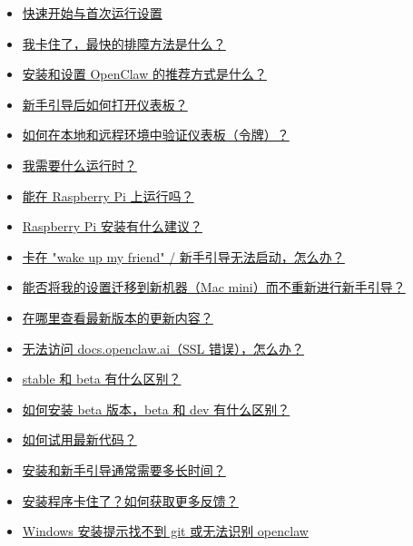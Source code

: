 \begin{itemize}
  \item \href{\#quick-start-and-firstrun-setup}{快速开始与首次运行设置}
  \item \href{\#im-stuck-whats-the-fastest-way-to-get-unstuck}{我卡住了，最快的排障方法是什么？}
  \item \href{\#whats-the-recommended-way-to-install-and-set-up-openclaw}{安装和设置 OpenClaw 的推荐方式是什么？}
  \item \href{\#how-do-i-open-the-dashboard-after-onboarding}{新手引导后如何打开仪表板？}
  \item \href{\#how-do-i-authenticate-the-dashboard-token-on-localhost-vs-remote}{如何在本地和远程环境中验证仪表板（令牌）？}
  \item \href{\#what-runtime-do-i-need}{我需要什么运行时？}
  \item \href{\#does-it-run-on-raspberry-pi}{能在 Raspberry Pi 上运行吗？}
  \item \href{\#any-tips-for-raspberry-pi-installs}{Raspberry Pi 安装有什么建议？}
  \item \href{\#it-is-stuck-on-wake-up-my-friend-onboarding-will-not-hatch-what-now}{卡在 "wake up my friend" / 新手引导无法启动，怎么办？}
  \item \href{\#can-i-migrate-my-setup-to-a-new-machine-mac-mini-without-redoing-onboarding}{能否将我的设置迁移到新机器（Mac mini）而不重新进行新手引导？}
  \item \href{\#where-do-i-see-whats-new-in-the-latest-version}{在哪里查看最新版本的更新内容？}
  \item \href{\#i-cant-access-docsopenclawai-ssl-error-what-now}{无法访问 docs.openclaw.ai（SSL 错误），怎么办？}
  \item \href{\#whats-the-difference-between-stable-and-beta}{stable 和 beta 有什么区别？}
  \item \href{\#how-do-i-install-the-beta-version-and-whats-the-difference-between-beta-and-dev}{如何安装 beta 版本，beta 和 dev 有什么区别？}
  \item \href{\#how-do-i-try-the-latest-bits}{如何试用最新代码？}
  \item \href{\#how-long-does-install-and-onboarding-usually-take}{安装和新手引导通常需要多长时间？}
  \item \href{\#installer-stuck-how-do-i-get-more-feedback}{安装程序卡住了？如何获取更多反馈？}
  \item \href{\#windows-install-says-git-not-found-or-openclaw-not-recognized}{Windows 安装提示找不到 git 或无法识别 openclaw}

\end{itemize}
